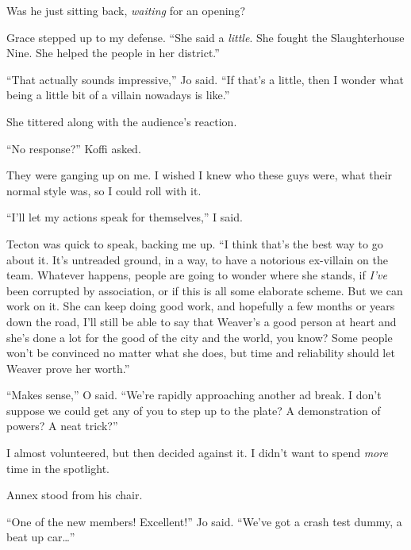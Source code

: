 Was he just sitting back, \emph{waiting} for an opening?



Grace stepped up to my defense.  ``She said a \emph{little}.  She fought the Slaughterhouse Nine.  She helped the people in her district.''



``That actually sounds impressive,'' Jo said.  ``If that's a little, then I wonder what being a little bit of a villain nowadays is like.''



She tittered along with the audience's reaction.



``No response?'' Koffi asked.



They were ganging up on me.  I wished I knew who these guys were, what their normal style was, so I could roll with it.



``I'll let my actions speak for themselves,'' I said.



Tecton was quick to speak, backing me up.  ``I think that's the best way to go about it.  It's untreaded ground, in a way, to have a notorious ex-villain on the team.  Whatever happens, people are going to wonder where she stands, if \emph{I've} been corrupted by association, or if this is all some elaborate scheme.  But we can work on it.  She can keep doing good work, and hopefully a few months or years down the road, I'll still be able to say that Weaver's a good person at heart and she's done a lot for the good of the city and the world, you know?  Some people won't be convinced no matter what she does, but time and reliability should let Weaver prove her worth.''



``Makes sense,'' O said.  ``We're rapidly approaching another ad break.  I don't suppose we could get any of you to step up to the plate?  A demonstration of powers?  A neat trick?''



I almost volunteered, but then decided against it.  I didn't want to spend \emph{more} time in the spotlight.



Annex stood from his chair.



``One of the new members!  Excellent!''  Jo said.  ``We've got a crash test dummy, a beat up car\ldots''



